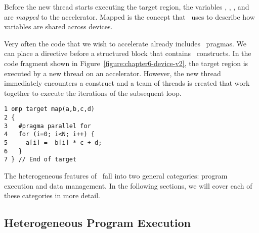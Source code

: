 Before the new thread starts executing the target region, the 
variables , , , and  are \emph{mapped} to the accelerator.
Mapped is the concept that \OMP\ uses to
describe how variables are shared across devices.


Very often the code that we wish to accelerate already includes \OMP\ pragmas.
We can place a  directive before a structured block that contains
\OMP\ constructs.  In the code fragment shown in
Figure~\ref{figure:chapter6-device-v2}, the target region is executed by a new
thread on an accelerator.  However, the new thread immediately encounters a
 construct and a team of threads is created that work
together to execute the iterations of the subsequent loop.

\begin{figure*}[!tbhp]
\begin{verbatim}
1 omp target map(a,b,c,d)
2 {
3   #pragma parallel for
4   for (i=0; i<N; i++) {
5     a[i] =  b[i] * c + d;
6   }
7 } // End of target
\end{verbatim}
\caption{ \textbf {Augmented code fragment with a parallel region} -- \small
          The parallel region is executed by a team of threads running
          on an accelerator.
        }
\label{figure:chapter6-device-v2}
\end{figure*}

The heterogeneous features of \OMP\ fall into two general categories: program
execution and data management.  In the following sections, we will cover each of
these categories in more detail.

\subsection{Heterogeneous Program Execution}
\label{sec:06.execution-model}

